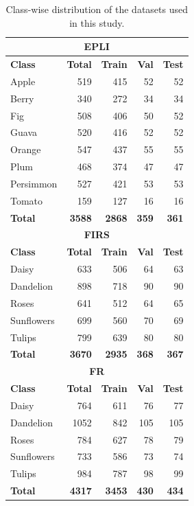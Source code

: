 \documentclass[a4paper,fleqn]{cas-dc}
\begin{document}
\begin{table}[t]
\centering
\caption{Class-wise distribution of the datasets used in this study.}
\label{tab:classwise_dataset_distribution}
\begin{tabular}{|l|r|r|r|r|}
\hline
\multicolumn{5}{|c|}{\textbf{EPLI}} \\
\hline
\textbf{Class} & \textbf{Total} & \textbf{Train} & \textbf{Val} & \textbf{Test} \\
\hline
Apple      & 519 & 415 & 52 & 52 \\
Berry      & 340 & 272 & 34 & 34 \\
Fig        & 508 & 406 & 50 & 52 \\
Guava      & 520 & 416 & 52 & 52 \\
Orange     & 547 & 437 & 55 & 55 \\
Plum       & 468 & 374 & 47 & 47 \\
Persimmon  & 527 & 421 & 53 & 53 \\
Tomato     & 159 & 127 & 16 & 16 \\
\hline
\textbf{Total} & \textbf{3588} & \textbf{2868} & \textbf{359} & \textbf{361} \\
\hline

\multicolumn{5}{|c|}{\textbf{FIRS}} \\
\hline
\textbf{Class} & \textbf{Total} & \textbf{Train} & \textbf{Val} & \textbf{Test} \\
\hline
Daisy       & 633 & 506 & 64 & 63 \\
Dandelion   & 898 & 718 & 90 & 90 \\
Roses       & 641 & 512 & 64 & 65 \\
Sunflowers  & 699 & 560 & 70 & 69 \\
Tulips      & 799 & 639 & 80 & 80 \\
\hline
\textbf{Total} & \textbf{3670} & \textbf{2935} & \textbf{368} & \textbf{367} \\
\hline

\multicolumn{5}{|c|}{\textbf{FR}} \\
\hline
\textbf{Class} & \textbf{Total} & \textbf{Train} & \textbf{Val} & \textbf{Test} \\
\hline
Daisy       & 764  & 611 & 76 & 77 \\
Dandelion   & 1052 & 842 & 105 & 105 \\
Roses       & 784  & 627 & 78 & 79 \\
Sunflowers  & 733  & 586 & 73 & 74 \\
Tulips      & 984  & 787 & 98 & 99 \\
\hline
\textbf{Total} & \textbf{4317} & \textbf{3453} & \textbf{430} & \textbf{434} \\
\hline
\end{tabular}
\end{table}
\end{document}
